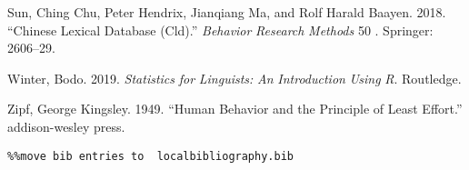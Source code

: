 \hypertarget{bookmarkid1mrcu09}{}Sun, Ching Chu, Peter Hendrix, Jianqiang Ma, and Rolf Harald Baayen. 2018. “Chinese Lexical Database (Cld).” \textit{Behavior} \textit{Research} \textit{Methods} 50 . Springer: 2606–29.

\hypertarget{bookmarkid46r0co2}{}Winter, Bodo. 2019. \textit{Statistics} \textit{for} \textit{Linguists:} \textit{An} \textit{Introduction} \textit{Using} \textit{R}. Routledge.

\hypertarget{bookmarkid2lwamvv}{}Zipf, George Kingsley. 1949. “Human Behavior and the Principle of Least Effort.” addison-wesley press.


\begin{verbatim}%%move bib entries to  localbibliography.bib
\end{verbatim} 